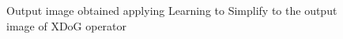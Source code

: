 \begin{figure}[htbp]
    \centering
     \quad
    \caption{Output image obtained applying Learning to Simplify to the output image of XDoG operator}
    \label{fig:xdogSimplifyRes}
\end{figure}